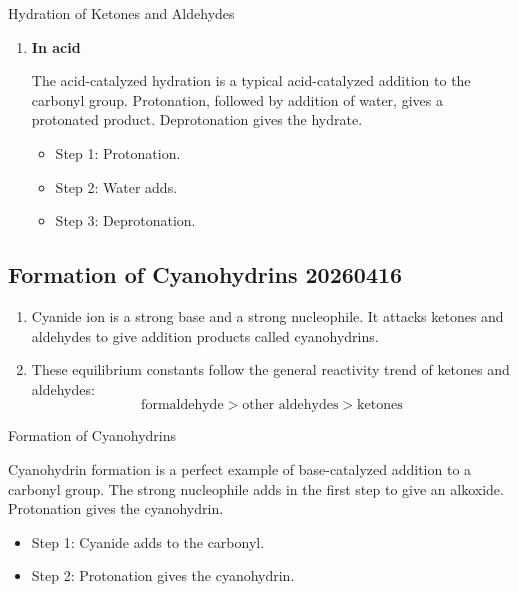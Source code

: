 \begin{mechanism}
    Hydration of Ketones and Aldehydes
    \begin{enumerate}
        \item \textbf{In acid}
        
        The acid-catalyzed hydration is a typical acid-catalyzed addition to the carbonyl group. Protonation, followed by addition of water, gives a protonated product. Deprotonation gives the hydrate.
        \begin{itemize}
            \item Step 1: Protonation.
            \item Step 2: Water adds.
            \item Step 3: Deprotonation.
        \end{itemize}
    \end{enumerate}
\end{mechanism}

\subsection{Formation of Cyanohydrins 20260416}

\begin{enumerate}
    \item Cyanide ion is a strong base and a strong nucleophile. It attacks ketones and aldehydes to give addition products called cyanohydrins.
    \item These equilibrium constants follow the general reactivity trend of ketones and aldehydes: 
    \begin{equation*}
        \text{formaldehyde} > \text{other aldehydes} > \text{ketones}
    \end{equation*}
\end{enumerate}

\begin{mechanism}
    Formation of Cyanohydrins

    Cyanohydrin formation is a perfect example of base-catalyzed addition to a carbonyl group. The strong nucleophile adds in the first step to give an alkoxide. Protonation gives the cyanohydrin.
    \begin{itemize}
        \item Step 1: Cyanide adds to the carbonyl.
        \item Step 2: Protonation gives the cyanohydrin.
    \end{itemize}
\end{mechanism}


